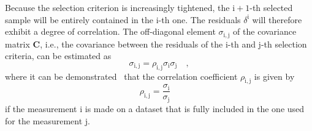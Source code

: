Because the selection criterion is increasingly tightened, the $\mathrm{i+1}$-th selected sample will be entirely contained in the $\mathrm{i}$-th one. The residuals $\delta^\mathrm{i}$ will therefore exhibit a degree of correlation. The off-diagonal element $\sigma_\mathrm{i,j}$ of the covariance matrix $\mathbf{C}$, i.e., the covariance between the residuals of the i-th and j-th selection criteria, can be estimated as 
\begin{equation*}
    \sigma_\mathrm{i,j} = \rho_\mathrm{i,j}\sigma_\mathrm{i}\sigma_\mathrm{j}\quad ,
\end{equation*}
where it can be demonstrated~\cite{cowan1998statistical} that the correlation coefficient $\rho_\mathrm{i,j}$ is given by 
\begin{equation*}
    \rho_\mathrm{i,j} = \frac{\sigma_\mathrm{i}}{\sigma_\mathrm{j}}\quad 
\end{equation*}
if the measurement i is made on a dataset that is fully included in the one used for the measurement j. 

